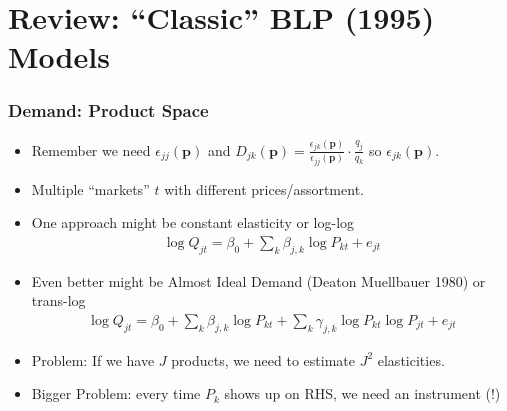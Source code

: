 \documentclass[aspectratio=169,10pt]{beamer}
\begin{document}



\section*{Review: ``Classic'' BLP (1995) Models}

\begin{frame}
\frametitle{Demand: Product Space}
\begin{itemize}
    \item Remember we need $\epsilon_{jj}(\symbf{p})$ and $D_{jk}(\symbf{p}) = \frac{\epsilon_{jk}(\symbf{p})}{\epsilon_{jj}(\symbf{p})}\cdot \frac{q_j}{q_k}$ so $\epsilon_{jk}(\symbf{p})$.
    \item Multiple ``markets'' $t$ with different prices/assortment.
    \item One approach might be \alert{constant elasticity} or \alert{log-log}
    \begin{align*}
        \log Q_{jt} = \beta_0 + \sum_{k} \beta_{j,k} \log P_{kt} + e_{jt}
    \end{align*}
    \item Even better might be \alert{Almost Ideal Demand} (Deaton Muellbauer 1980) or \alert{trans-log}
    \begin{align*}
        \log Q_{jt} = \beta_0 + \sum_{k} \beta_{j,k} \log P_{kt} + \sum_{k} \gamma_{j,k} \log P_{kt} \log P_{jt} +  e_{jt}
    \end{align*}
    \item Problem: If we have $J$ products, we need to estimate $J^2$ elasticities.
    \item Bigger Problem: every time $P_k$ shows up on RHS, we need an instrument (!)
\end{itemize}
\end{frame}
\end{document}
